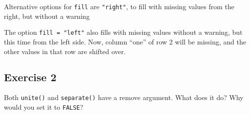 \documentclass[]{book}
\newenvironment{Shaded}{\begin{snugshade}}{\end{snugshade}}
\newcommand{\CommentTok}[1]{\textcolor[rgb]{0.56,0.35,0.01}{\textit{#1}}}
\newcommand{\DataTypeTok}[1]{\textcolor[rgb]{0.13,0.29,0.53}{#1}}
\newcommand{\KeywordTok}[1]{\textcolor[rgb]{0.13,0.29,0.53}{\textbf{#1}}}
\newcommand{\NormalTok}[1]{#1}
\newcommand{\OperatorTok}[1]{\textcolor[rgb]{0.81,0.36,0.00}{\textbf{#1}}}
\newcommand{\StringTok}[1]{\textcolor[rgb]{0.31,0.60,0.02}{#1}}
\theoremstyle{plain}
\theoremstyle{remark}
\theoremstyle{definition}
\theoremstyle{definition}
\theoremstyle{definition}
\theoremstyle{remark}
\begin{document}
Alternative options for \texttt{fill} are \texttt{"right"}, to fill with
missing values from the right, but without a warning

\begin{Shaded}
\end{Shaded}

The option \texttt{fill\ =\ "left"} also fills with missing values
without a warning, but this time from the left side. Now, column ``one''
of row 2 will be missing, and the other values in that row are shifted
over.

\begin{Shaded}
\end{Shaded}

\hypertarget{exercise-2-22}{%
\subsection{Exercise 2}\label{exercise-2-22}}

Both \texttt{unite()} and \texttt{separate()} have a remove argument.
What does it do? Why would you set it to \texttt{FALSE}?
\end{document}
